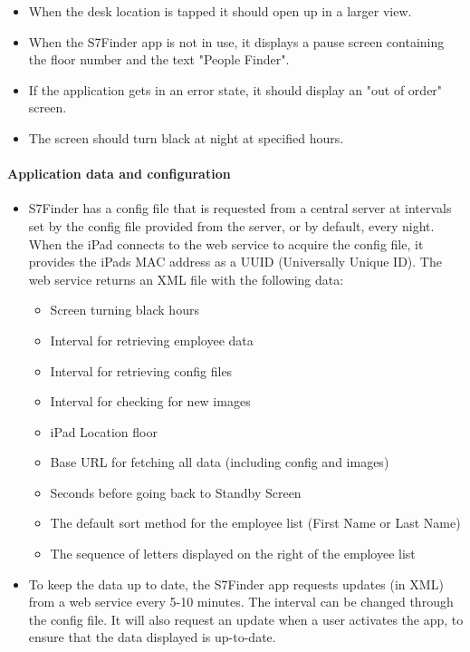 \begin{itemize}
	\item When the desk location is tapped it should open up in a
      larger view.

    \item When the S7Finder app is not in use, it displays a pause
      screen containing the floor number and the text "People Finder".

    \item If the application gets in an error state, it should display
      an "out of order" screen.

    \item The screen should turn black at night at specified hours.

\end{itemize}

\paragraph{Application data and configuration}
\begin{itemize}
\item S7Finder has a config file that is requested from a central
  server at intervals set by the config file provided from the server,
  or by default, every night. When the iPad connects to the web
  service to acquire the config file, it provides the iPads MAC
  address as a UUID (Universally Unique ID).  The web service returns
  an XML file with the following data:
  \begin{itemize}
  \item Screen turning black hours
  \item Interval for retrieving employee data
  \item Interval for retrieving config files
  \item Interval for checking for new images
  \item iPad Location floor
  \item Base URL for fetching all data (including config and images)
  \item Seconds before going back to Standby Screen
  \item The default sort method for the employee list (First Name or
    Last Name)
  \item The sequence of letters displayed on the right of the employee
    list
  \end{itemize}

\item To keep the data up to date, the S7Finder app requests updates
  (in XML) from a web service every 5-10 minutes. The interval can be
  changed through the config file.  It will also request an update
  when a user activates the app, to ensure that the data displayed is
  up-to-date.
\end{itemize}

